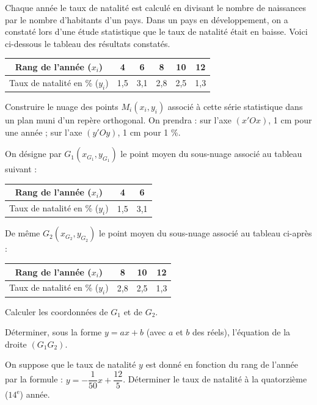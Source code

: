 \documentclass[11pt]{article}
\begin{document}
Chaque année le taux de natalité est calculé en divisant le nombre de naissances par le nombre d'habitants d'un pays. Dans un pays en développement, on a constaté lors d'une étude statistique que le taux de natalité était en baisse. Voici ci-dessous le tableau des résultats constatés.
\begin{center}\renewcommand{\arraystretch}{1.4}
\begin{tabular}{|c|c|c|c|c|c|}
\hline
Rang de l'année ($x_i$) & 4 & 6 & 8 & 10 & 12 \\
\hline
Taux de natalité en \% ($y_i$) & 1{,}5 & 3{,}1 & 2{,}8 & 2{,}5 & 1{,}3 \\
\hline
\end{tabular}
\end{center}
\begin{questions}
  \item Construire le nuage des points $M_i(x_i, y_i)$ associé à cette série statistique dans un plan muni d'un repère orthogonal. On prendra : sur l'axe $(x'Ox)$, 1 cm pour une année ; sur l'axe $(y'Oy)$, 1 cm pour 1 \%.
  \item On désigne par $G_1(x_{G_1}, y_{G_1})$ le point moyen du sous-nuage associé au tableau suivant :
  \begin{center}\renewcommand{\arraystretch}{1.4}
  \begin{tabular}{|c|c|c|}\hline Rang de l'année ($x_i$) & 4 & 6 \\\hline Taux de natalité en \% ($y_i$) & 1{,}5 & 3{,}1 \\\hline\end{tabular}
  \end{center}
  De même $G_2(x_{G_2}, y_{G_2})$ le point moyen du sous-nuage associé au tableau ci-après :
  \begin{center}\renewcommand{\arraystretch}{1.4}
  \begin{tabular}{|c|c|c|c|}\hline Rang de l'année ($x_i$) & 8 & 10 & 12 \\\hline Taux de natalité en \% ($y_i$) & 2{,}8 & 2{,}5 & 1{,}3 \\\hline\end{tabular}
  \end{center}
  \begin{sousq}
    \item Calculer les coordonnées de $G_1$ et de $G_2$.
    \item Déterminer, sous la forme $y = ax + b$ (avec $a$ et $b$ des réels), l'équation de la droite $(G_1G_2)$.
    \item On suppose que le taux de natalité $y$ est donné en fonction du rang de l'année par la formule : $y = -\dfrac{1}{50}x + \dfrac{12}{5}$. Déterminer le taux de natalité à la quatorzième ($14^{\text{e}}$) année.
  \end{sousq}
\end{questions}
\end{document}
